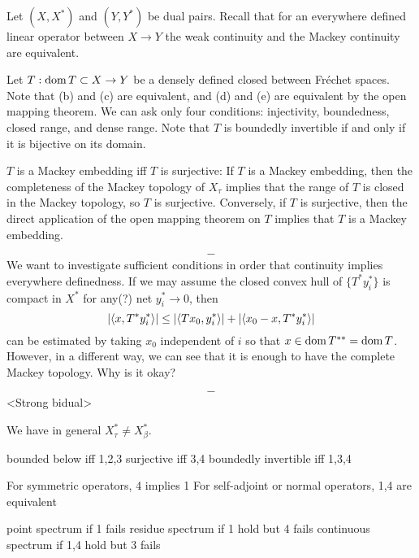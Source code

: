 \documentclass{../../large}
\begin{document}
\begin{prb}
Let $(X,X^*)$ and $(Y,Y^*)$ be dual pairs.
Recall that for an everywhere defined linear operator between $X\to Y$ the weak continuity and the Mackey continuity are equivalent.

Let $T:\operatorname{dom} T\subset X\to Y$ be a densely defined closed between Fr\'echet spaces.
Note that (b) and (c) are equivalent, and (d) and (e) are equivalent by the open mapping theorem.
We can ask only four conditions: injectivity, boundedness, closed range, and dense range.
Note that $T$ is boundedly invertible if and only if it is bijective on its domain.
\end{prb}
\begin{pf}

$T$ is a Mackey embedding iff $T$ is surjective:
If $T$ is a Mackey embedding, then the completeness of the Mackey topology of $X_\tau$ implies that the range of $T$ is closed in the Mackey topology, so $T$ is surjective.
Conversely, if $T$ is surjective, then the direct application of the open mapping theorem on $T$ implies that $T$ is a Mackey embedding.

\end{pf}

\[-\]
We want to investigate sufficient conditions in order that continuity implies everywhere definedness.
If we may assume the closed convex hull of $\{T^*y_i^*\}$ is compact in $X^*$ for any(?) net $y_i^*\to0$, then
\[|\langle x,T^*y_i^*\rangle|\le|\langle Tx_0,y_i^*\rangle|+|\langle x_0-x,T^*y_i^*\rangle|\]
can be estimated by taking $x_0$ independent of $i$ so that $x\in\operatorname{dom} T^{**}=\operatorname{dom} T$.
However, in a different way, we can see that it is enough to have the complete Mackey topology. Why is it okay?




\[-\]
<Strong bidual>

We have in general $X_\tau^*\ne X_\beta^*$.




bounded below iff 1,2,3
surjective iff 3,4
boundedly invertible iff 1,3,4

For symmetric operators, 4 implies 1
For self-adjoint or normal operators, 1,4 are equivalent

point spectrum if 1 fails
residue spectrum if 1 hold but 4 fails
continuous spectrum if 1,4 hold but 3 fails






\begin{prb}[Cores]
\end{prb}
\end{document}
